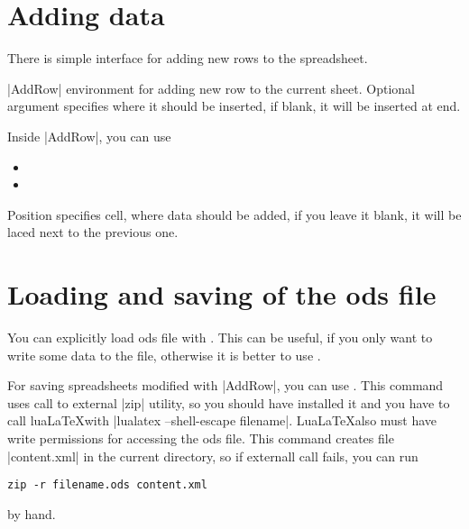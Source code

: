 \documentclass{ltxdoc}
\newcommand\ods{\textsf{ods}\xspace}
\begin{document}
\section{Adding data}

There is simple interface for adding new rows to the spreadsheet.

|AddRow| environment for adding new row to the current sheet. Optional argument  specifies where it should be inserted, if blank, it will be inserted at end.

Inside |AddRow|, you can use 
\begin{itemize}
	\item \cmd{\AddString} 
	\item \cmd{\AddNumber}
\end{itemize} 
Position specifies cell, where data should be added, if you leave it blank, it will be laced next to the previous one.

\begin{LTXexample}
\begin{AddRow}
\end{AddRow} 
\begin{AddRow}[3]
\end{AddRow} 
\end{LTXexample}

\section{Loading and saving of the \ods file}

You can explicitly load \ods file with \marginpar{\cmd{\loadodsfile}}\cmd{\loadodsfile}. This can be useful, if you only want to write some data to the file, otherwise it is better to use .

For saving spreadsheets modified with |AddRow|, you can use \cmd{\savespreadsheet}\marginpar{\cmd{\savespreadsheet}}. This command uses call to external |zip| utility, so you should have installed it and you have to call lua\LaTeX with |lualatex --shell-escape filename|. Lua\LaTeX also must have write permissions for accessing the \ods file. This command creates file |content.xml| in the current directory, so if externall call fails, you can run
\begin{verbatim}
zip -r filename.ods content.xml
\end{verbatim} 
by hand.
\end{document}
